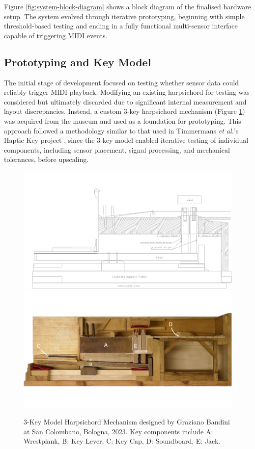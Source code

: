 Figure \ref{fig:system-block-diagram} shows a block diagram of the finalised hardware setup. The system evolved through iterative prototyping, beginning with simple threshold-based testing and ending in a fully functional multi-sensor interface capable of triggering MIDI events. 

\subsection{Prototyping and Key Model}

The initial stage of development focused on testing whether sensor data could reliably trigger MIDI playback. Modifying an existing harpsichord for testing was considered but ultimately discarded due to significant internal measurement and layout discrepancies. Instead, a custom 3-key harpsichord mechanism (Figure \ref{fig:3key}) was acquired from the museum and used as a foundation for prototyping. This approach followed a methodology similar to that used in Timmermans \emph{et al.}'s Haptic Key project \cite{Timmermans2020}, since the 3-key model enabled iterative testing of individual components, including sensor placement, signal processing, and mechanical tolerances, before upscaling. 

\begin{figure}
    \centering
    \includegraphics[width=\linewidth]{src/images/CrossSectionSensorPlacement.jpg}
    \\
    \includegraphics[width=\linewidth]{src/images/3-key-side-labelled.png}
    \caption{3-Key Model Harpsichord Mechanism designed by Graziano Bandini at San Colombano, Bologna, 2023. Key components include A: Wrestplank, B: Key Lever, C: Key Cap, D: Soundboard, E: Jack.}
    \label{fig:3key}
\end{figure}


